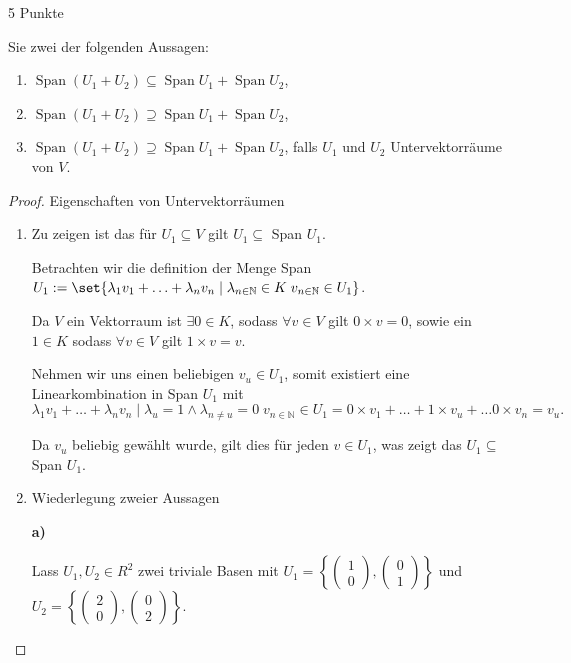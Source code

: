\documentclass{problemset}
\begin{document}
\begin{problem}{5 Punkte}
\begin{enumerate}
	      Sie zwei der folgenden Aussagen:
	      \begin{enumerate}[label=\alph*)]
		      \item $\operatorname{Span}(U_1 + U_2) \subseteq \operatorname{Span} U_1 + \operatorname{Span} U_2$,
		      \item $\operatorname{Span}(U_1 + U_2) \supseteq \operatorname{Span} U_1 + \operatorname{Span} U_2$,
		      \item $\operatorname{Span}(U_1 + U_2) \supseteq \operatorname{Span} U_1 + \operatorname{Span} U_2$, falls $U_1$ und $U_2$ Untervektorräume von $V$.
	      \end{enumerate}
\end{enumerate}
\begin{proof}
	Eigenschaften von Untervektorräumen
	\begin{enumerate}
		\item Zu zeigen ist das für $U_1 \subseteq V$ gilt $U_1 \subseteq$ Span $U_1$.

		      Betrachten wir die definition der Menge Span $U_1 := \set{\lambda_1 v_1 + \ldots + \lambda_n v_n \mid \lambda_{n \in \mathbb{N}} \in K \; v_{n \in \mathbb{N}} \in U_1}$.

		      Da $V$ ein Vektorraum ist $\exists 0 \in K$, sodass $\forall v \in V$ gilt $0 \times v = 0$, sowie ein $1 \in K$ sodass $\forall v \in V$ gilt $1 \times v = v$.

		      Nehmen wir uns einen beliebigen $v_u \in U_1$, somit existiert eine Linearkombination in Span $U_1$ mit \[
			      \lambda_1 v_1 + \ldots + \lambda_n v_n \mid \lambda_u = 1 \land \lambda_{n \ne u} = 0 \; v_{n \in \mathbb{N}} \in U_1 = 0 \times v_1 + \ldots + 1 \times v_u + \ldots 0 \times v_n = v_u.
		      \]

		      Da \(v_u\) beliebig gewählt wurde, gilt dies für jeden \(v \in U_1\), was zeigt das $U_1 \subseteq$ Span $U_1$. \checkmark
		\item Wiederlegung zweier Aussagen

		      \textbf{a)}

		      Lass \(U_1, U_2 \in R^2\) zwei triviale Basen mit \(U_1 = \left\{\begin{pmatrix}
			      1 \\ 0
		      \end{pmatrix},
		      \begin{pmatrix}
			      0 \\ 1
		      \end{pmatrix}\right\}\) und \(U_2 = \left\{\begin{pmatrix}
			      2 \\ 0
		      \end{pmatrix},
		      \begin{pmatrix}
			      0 \\ 2
		      \end{pmatrix}\right\}\).


\end{enumerate}
\end{proof}
\end{problem}
\end{document}
